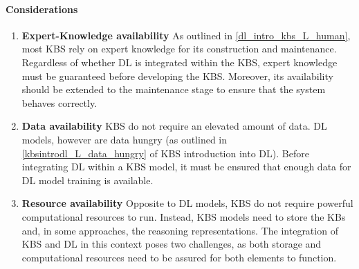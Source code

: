 \paragraph{Considerations}
\begin{enumerate} [start=1,label={\bfseries C\arabic*.}]
    \item \textbf{Expert-Knowledge availability}\label{dlintrokbs_C_expert} As outlined in \ref{dl_intro_kbs_L_human}, most KBS rely on expert knowledge for its construction and maintenance. Regardless of whether DL is integrated within the KBS, expert knowledge must be guaranteed before developing the KBS. Moreover, its availability should be extended to the maintenance stage to ensure that the system behaves correctly.
    
    \item \textbf{Data availability}\label{dlintrokbs_C_data} KBS do not require an elevated amount of data. DL models, however are data hungry (as outlined in \ref{kbsintrodl_L_data_hungry} of KBS introduction into DL). Before integrating DL within a KBS model, it must be ensured that enough data for DL model training is available. 
    
    \item \textbf{Resource availability}\label{dlintrokbs_C_resource} Opposite to DL models, KBS do not require powerful computational resources to run. Instead, KBS models need to store the KBs and, in some approaches, the reasoning representations. The integration of KBS and DL in this context poses two challenges, as both storage and computational resources need to be assured for both elements to function.
\end{enumerate}
